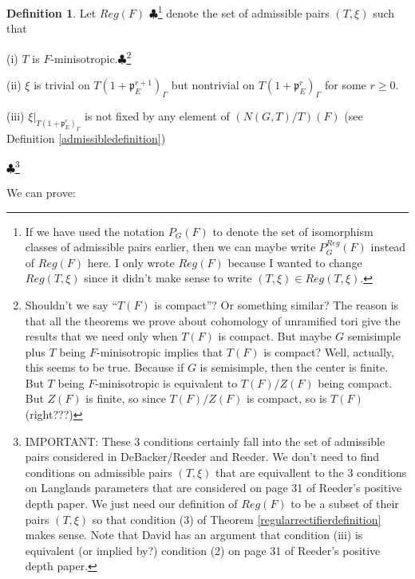 \documentclass[11pt]{amsart}
\theoremstyle{plain}
\newcommand{\MAxxx}[1]{$\clubsuit$\footnote{#1}}
\theoremstyle{definition}
\newtheorem{definition}[theorem]{Definition}
\begin{document}
\begin{definition}\label{regularpairs}
Let $Reg(F)$ \MAxxx{If we have used the notation $P_G(F)$ to denote
the set of isomorphism classes of admissible pairs earlier, then we can maybe
write $P_G^{Reg}(F)$ instead of $Reg(F)$ here.  I only wrote $Reg(F)$ because
I wanted to change $Reg(T,\xi)$ since it didn't make sense to write 
$(T,\xi) \in Reg(T,\xi)$.} denote the set of admissible pairs $(T,\xi)$ such that

(i) $T$ is $F$-minisotropic.\MAxxx{Shouldn't we say ``$T(F)$ is compact''?  Or something
similar?  The reason is that all the theorems we prove about cohomology of unramified tori
give the results that we need only when $T(F)$ is compact.  But maybe $G$ semisimple plus
$T$ being $F$-minisotropic implies that $T(F)$ is compact?  Well, actually, this seems 
to be true. Because if $G$ is semisimple, then the center is finite.  But $T$ being 
$F$-minisotropic is equivalent to $T(F) / Z(F)$ being compact.  But $Z(F)$ is finite, so
since $T(F) / Z(F)$ is compact, so is $T(F)$  (right???)}

(ii) $\xi$ is trivial on $T(1+\mathfrak{p}_E^{r+1})_{\Gamma}$ but nontrivial on
$T(1+\mathfrak{p}_E^{r})_{\Gamma}$ for some $r \geq 0$.

(iii) $\xi|_{T(1+\mathfrak{p}_E^{r})_{\Gamma}}$ is not fixed by any element of
$(N(G,T)/T)(F)$ (see Definition \ref{admissibledefinition})
\end{definition}
\MAxxx{IMPORTANT: These 3 conditions certainly fall into the set of admissible pairs considered in DeBacker/Reeder and Reeder.  We don't need to find conditions on admissible pairs $(T,\xi)$ that are equivallent to the 3 conditions on Langlands parameters that are considered on page 31 of Reeder's positive depth paper.  We just need our definition of $Reg(F)$ to be a subset of their pairs $(T,\xi)$ so that condition (3) of Theorem \ref{regularrectifierdefinition} makes sense. Note that David has an argument that condition (iii) is equivalent (or implied by?) condition (2) on page 31 of Reeder's positive depth paper.}

We can prove:
\end{document}
